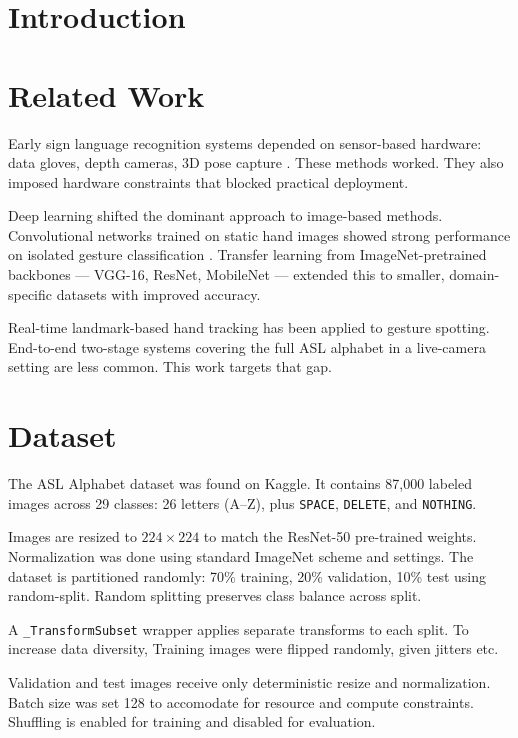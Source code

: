 \documentclass[conference]{IEEEtran}
\begin{document}
\section{Introduction}


\section{Related Work}

Early sign language recognition systems depended on sensor-based hardware: data gloves, depth cameras, 3D pose capture \cite{mitra2007}. These methods worked. They also imposed hardware constraints that blocked practical deployment.

Deep learning shifted the dominant approach to image-based methods. Convolutional networks trained on static hand images showed strong performance on isolated gesture classification \cite{pigou2015}. Transfer learning from ImageNet-pretrained backbones — VGG-16, ResNet, MobileNet — extended this to smaller, domain-specific datasets with improved accuracy.

Real-time landmark-based hand tracking has been applied to gesture spotting. End-to-end two-stage systems covering the full ASL alphabet in a live-camera setting are less common. This work targets that gap.

\section{Dataset}

The ASL Alphabet dataset \cite{kaggle_asl} was found on Kaggle. 
It contains 87,000 labeled images across 29 classes: 26 letters (A--Z), plus \texttt{SPACE}, 
\texttt{DELETE}, and \texttt{NOTHING}.

Images are resized to $224 \times 224$ to match the ResNet-50 pre-trained weights. 
Normalization was done using standard ImageNet scheme and settings.
The dataset is partitioned randomly: 70\% training, 20\% validation, 10\% test using random-split. 
Random splitting preserves class balance across split.

A \texttt{\_TransformSubset} wrapper applies separate transforms to each split. To increase data diversity,
Training images were flipped randomly, given jitters etc. 

Validation and test images receive only deterministic resize and normalization. 
Batch size was set 128 to accomodate for resource and compute constraints. 
Shuffling is enabled for training and disabled for evaluation.
\end{document}
